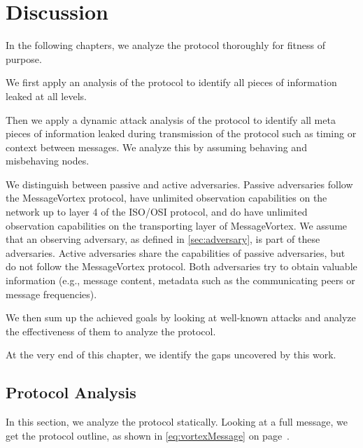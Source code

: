 
\part{Discussion \label{sec:discussion}}

In the following chapters, we analyze the protocol thoroughly for fitness of purpose. 

We first apply an analysis of the protocol to identify all pieces of information leaked at all levels.

Then we apply a dynamic attack analysis of the protocol to identify all meta pieces of information leaked during transmission of the protocol such as timing or context between messages. We analyze this by assuming behaving and misbehaving nodes.

We distinguish between passive and active adversaries. Passive adversaries follow the MessageVortex protocol, have unlimited observation capabilities on the network up to layer 4 of the ISO/OSI protocol, and do have unlimited observation capabilities on the transporting layer of MessageVortex. We assume that an observing adversary, as defined in \ref{sec:adversary}, is part of these adversaries. Active adversaries share the capabilities of passive adversaries, but do not follow the MessageVortex protocol. Both adversaries try to obtain valuable information (e.g., message content, metadata such as the communicating peers or message frequencies). 

We then sum up the achieved goals by looking at well-known attacks and analyze the effectiveness of them to analyze the protocol.

At the very end of this chapter, we identify the gaps uncovered by this work.

\chapter{Protocol Analysis}
In this section, we analyze the protocol statically. Looking at a full message, we get the protocol outline, as shown in \eqref{eq:vortexMessage} on page~\pageref{eq:vortexMessage}.

